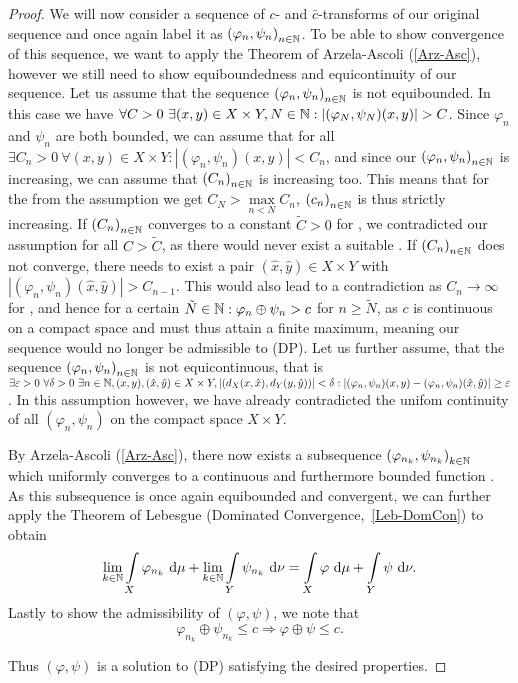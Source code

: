 \begin{proof}
	We will now consider a sequence of $c$- and $\bar{c}$-transforms of our original sequence and once again label it as ${(\varphi_n, \psi_n)}_{\NinN}$. To be able to show convergence of this sequence, we want to apply the Theorem of Arzela-Ascoli (\ref{Arz-Asc}), however we still need to show equiboundedness and equicontinuity of our sequence. Let us assume that the sequence ${(\varphi_n, \psi_n)}_{\NinN}$ is not equibounded. In this case we have $\forall C > 0~\exists (x, y) \in X \times Y, \NinN[N]: |(\varphi_N, \psi_N)(x, y)| > C$. Since $\varphi_n$ and $\psi_n$ are both bounded, we can assume that  for all \NinN{} $\exists C_n > 0~\forall (x, y) \in X \times Y: |(\varphi_n, \psi_n)(x, y)| < C_n$, and since our ${(\varphi_n, \psi_n)}_{\NinN}$ is increasing, we can assume that ${(C_n)}_{\NinN}$ is increasing too. This means that for the \NinN[N] from the assumption we get $C_N > \max\limits_{n < N} C_n$, ${(c_n)}_{\NinN}$ is thus strictly increasing. If ${(C_n)}_{\NinN}$ converges to a constant $\tilde{C} > 0$ for \Ninf{}, we contradicted our assumption for all $C > \tilde{C}$, as there would never exist a suitable \NinN. If ${(C_n)}_{\NinN}$ does not converge, there needs to exist a pair $(\hat{x}, \hat{y}) \in X \times Y$ with $|(\varphi_n, \psi_n)(\hat{x}, \hat{y})| > C_{n - 1}$. This would also lead to a contradiction as $C_n \rightarrow \infty$ for \Ninf{}, and hence for a certain $\NinN[\tilde{N}]: \varphi_n \oplus \psi_n > c$ for $n \ge \tilde{N}$, as $c$ is continuous on a compact space and must thus attain a finite maximum, meaning our sequence would no longer be admissible to (DP). Let us further assume, that the sequence ${(\varphi_n, \psi_n)}_{\NinN}$ is not equicontinuous, that is $\exists \varepsilon > 0~\forall \delta > 0~\exists \NinN, (x, y), (\hat{x}, \hat{y}) \in X \times Y,|(d_X(x, \hat{x}), d_Y(y, \hat{y}))|< \delta: |(\varphi_n, \psi_n)(x, y) - (\varphi_n, \psi_n)(\hat{x}, \hat{y})| \ge \varepsilon$. In this assumption however, we have already contradicted the unifom continuity of all $(\varphi_n, \psi_n)$ on the compact space $X \times Y$.
	
	By Arzela-Ascoli (\ref{Arz-Asc}), there now exists a subsequence ${(\varphi_{n_k}, \psi_{n_k})}_{\NinN[k]}$ which uniformly converges to a continuous and furthermore bounded function . As this subsequence is once again equibounded and convergent, we can further apply the Theorem of Lebesgue (Dominated Convergence,~\ref{Leb-DomCon}) to obtain
	\[ \lim\limits_{\NinN[k]} \int\limits_X \varphi_{n_k}~\D + \lim\limits_{\NinN[k]} \int\limits_Y \psi_{n_k}~\D[\nu] = \int\limits_X \varphi~\D + \int\limits_Y \psi~\D[\nu]. \]
	Lastly to show the admissibility of $(\varphi, \psi)$, we note that
	\[ \varphi_{n_k} \oplus \psi_{n_k} \le c \Rightarrow \varphi \oplus \psi \le c. \]

	Thus $(\varphi, \psi)$ is a solution to (DP) satisfying the desired properties.
\end{proof}

